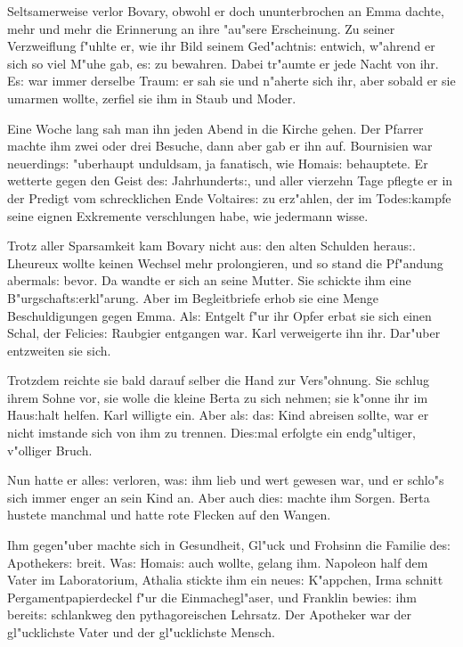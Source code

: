 \documentclass[oneside,12pt]{book}
\newcommand{\s}{s:}%
\begin{document}
Seltsamerweise verlor Bovary, obwohl er doch ununterbrochen an
Emma dachte, mehr und mehr die Erinnerung an ihre "au"sere
Erscheinung. Zu seiner Verzweiflung f"uhlte er, wie ihr Bild
seinem Ged"achtni{\s} entwich, w"ahrend er sich so viel M"uhe gab,
e{\s} zu bewahren. Dabei tr"aumte er jede Nacht von ihr. E{\s} war
immer derselbe Traum: er sah sie und n"aherte sich ihr, aber
sobald er sie umarmen wollte, zerfiel sie ihm in Staub und Moder.

Eine Woche lang sah man ihn jeden Abend in die Kirche gehen. Der
Pfarrer machte ihm zwei oder drei Besuche, dann aber gab er ihn
auf. Bournisien war neuerding{\s} "uberhaupt unduldsam, ja
fanatisch, wie Homai{\s} behauptete. Er wetterte gegen den Geist
de{\s} Jahrhundert{\s}, und aller vierzehn Tage pflegte er in der
Predigt vom schrecklichen Ende Voltaire{\s} zu erz"ahlen, der im
Tode{\s}kampfe seine eignen Exkremente verschlungen habe, wie
jedermann wisse.

Trotz aller Sparsamkeit kam Bovary nicht au{\s} den alten Schulden
herau{\s}. Lheureux wollte keinen Wechsel mehr prolongieren, und
so stand die Pf"andung abermal{\s} bevor. Da wandte er sich an
seine Mutter. Sie schickte ihm eine B"urgschaft{\s}erkl"arung.
Aber im Begleitbriefe erhob sie eine Menge Beschuldigungen gegen
Emma. Al{\s} Entgelt f"ur ihr Opfer erbat sie sich einen Schal,
der Felicie{\s} Raubgier entgangen war. Karl verweigerte ihn ihr.
Dar"uber ent\/zweiten sie sich.

Trotzdem reichte sie bald darauf selber die Hand zur Vers"ohnung.
Sie schlug ihrem Sohne vor, sie wolle die kleine Berta zu sich
nehmen; sie k"onne ihr im Hau{\s}halt helfen. Karl willigte ein.
Aber al{\s} da{\s} Kind abreisen sollte, war er nicht imstande
sich von ihm zu trennen. Die{\s}mal erfolgte ein endg"ultiger,
v"olliger Bruch.

Nun hatte er alle{\s} verloren, wa{\s} ihm lieb und wert gewesen
war, und er schlo"s sich immer enger an sein Kind an. Aber auch
die{\s} machte ihm Sorgen. Berta hustete manchmal und hatte rote
Flecken auf den Wangen.

Ihm gegen"uber machte sich in Gesundheit, Gl"uck und Frohsinn die
Familie de{\s} Apotheker{\s} breit. Wa{\s} Homai{\s} auch wollte,
gelang ihm. Napoleon half dem Vater im Laboratorium, Athalia
stickte ihm ein neue{\s} K"appchen, Irma schnitt
Pergamentpapierdeckel f"ur die Einmachegl"aser, und Franklin
bewie{\s} ihm bereit{\s} schlankweg den pythagoreischen Lehrsatz.
Der Apotheker war der gl"ucklichste Vater und der gl"ucklichste
Mensch.
\end{document}
